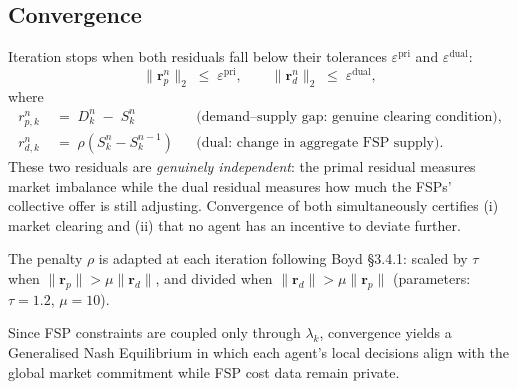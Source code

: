 \subsection*{Convergence}

Iteration stops when both residuals fall below their tolerances $\varepsilon^{\mathrm{pri}}$ and
$\varepsilon^{\mathrm{dual}}$:
\begin{equation}
\label{eq:convergence}
  \|\mathbf{r}_p^n\|_2 \;\leq\; \varepsilon^{\mathrm{pri}},
  \qquad
  \|\mathbf{r}_d^n\|_2 \;\leq\; \varepsilon^{\mathrm{dual}},
\end{equation}
where
\begin{align}
  r_{p,k}^n &\;=\; D_k^{n} \;-\; S_k^{n}
             && \text{(demand--supply gap: genuine clearing condition)}, \\[2pt]
  r_{d,k}^n &\;=\; \rho\!\left(S_k^n - S_k^{n-1}\right)
             && \text{(dual: change in aggregate FSP supply)}.
\end{align}
These two residuals are \emph{genuinely independent}: the primal residual measures market imbalance while the dual residual measures how much the FSPs' collective offer is still adjusting. Convergence of both simultaneously certifies (i) market clearing and (ii) that no agent has an incentive to deviate further.

The penalty $\rho$ is adapted at each iteration following Boyd §3.4.1:
scaled by $\tau$ when $\|\mathbf{r}_p\| > \mu\|\mathbf{r}_d\|$, and divided when
$\|\mathbf{r}_d\| > \mu\|\mathbf{r}_p\|$ (parameters: $\tau = 1.2$, $\mu = 10$).

Since FSP constraints are coupled only through $\lambda_k$, convergence yields a
Generalised Nash Equilibrium in which each agent's local decisions align with the
global market commitment while FSP cost data remain private.
